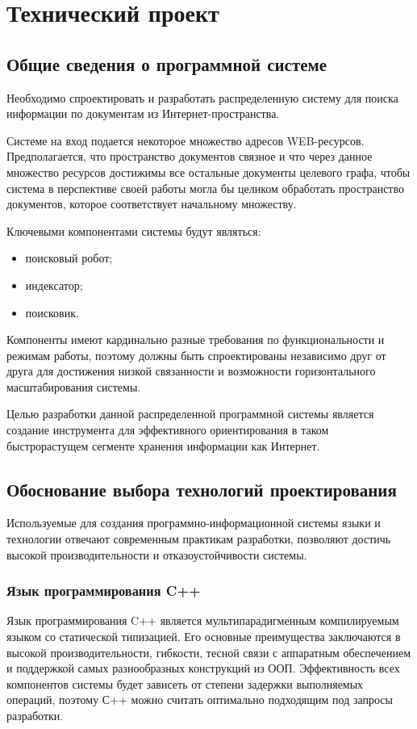 \newsection
\section{Технический проект}

\subsection{Общие сведения о программной системе}
Необходимо спроектировать и разработать распределенную систему для поиска информации по документам из Интернет-пространства.

Системе на вход подается некоторое множество адресов WEB-ресурсов.
Предполагается, что пространство документов связное и что через данное множество ресурсов достижимы все остальные документы целевого графа, чтобы система в перспективе своей работы могла бы целиком обработать пространство документов, которое соответствует начальному множеству.

Ключевыми компонентами системы будут являться:
\begin{itemize}
\item поисковый робот;
\item индексатор;
\item поисковик.
\end{itemize}

Компоненты имеют кардинально разные требования по функциональности и режимам работы, поэтому должны быть спроектированы независимо друг от друга для достижения низкой связанности и возможности горизонтального масштабирования системы.

Целью разработки данной распределенной программной системы является создание инструмента для эффективного ориентирования в таком быстрорастущем сегменте хранения информации как Интернет.

\subsection{Обоснование выбора технологий проектирования}
Используемые для создания программно-информационной системы
языки и технологии отвечают современным практикам разработки, позволяют достичь высокой производительности и отказоустойчивости системы.

\subsubsection{Язык программирования C++}

Язык программирования C++ является мультипарадигменным компилируемым языком со статической типизацией. Его основные преимущества заключаются в высокой производительности, гибкости, тесной связи с аппаратным обеспечением и поддержкой самых разнообразных конструкций из ООП. Эффективность всех компонентов системы будет зависеть от степени задержки выполняемых операций, поэтому С++ можно считать оптимально подходящим под запросы разработки.

